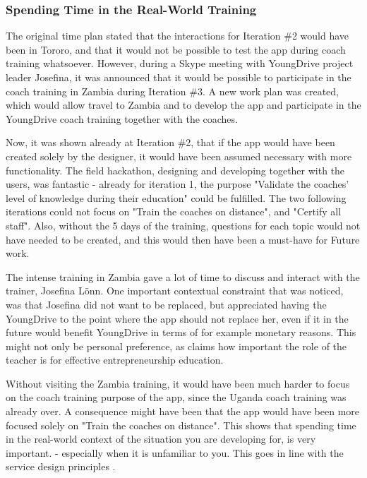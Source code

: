   \subsubsection{Spending Time in the Real-World Training}
  The original time plan stated that the interactions for Iteration \#2 would have been in Tororo, and that it would not be possible to test the app during coach training whatsoever. However, during a Skype meeting with YoungDrive project leader Josefina, it was announced that it would be possible to participate in the coach training in Zambia during Iteration \#3. A new work plan was created, which would allow travel to Zambia and to develop the app and participate in the YoungDrive coach training together with the coaches.


  Now, it was shown already at Iteration \#2, that if the app would have been created solely by the designer, it would have been assumed necessary with more functionality. The field hackathon, designing and developing together with the users, was fantastic - already for iteration 1, the purpose "Validate the coaches' level of knowledge during their education" could be fulfilled. The two following iterations could not focus on "Train the coaches on distance", and "Certify all staff". Also, without the 5 days of the training, questions for each topic would not have needed to be created, and this would then have been a must-have for Future work. %

  The intense training in Zambia gave a lot of time to discuss and interact with the trainer, Josefina Lönn. One important contextual constraint that was noticed, was that Josefina did not want to be replaced, but appreciated having the YoungDrive to the point where the app should not replace her, even if it in the future would benefit YoungDrive in terms of for example monetary reasons. This might not only be personal preference, as \cite{ruskovaara} claims how important the role of the teacher is for effective entrepreneurship education.

  Without visiting the Zambia training, it would have been much harder to focus on the coach training purpose of the app, since the Uganda coach training was already over. A consequence might have been that the app would have been more focused solely on "Train the coaches on distance". This shows that spending time in the real-world context of the situation you are developing for, is very important. - especially when it is unfamiliar to you. This goes in line with the service design principles \citep{stickdorn}.

